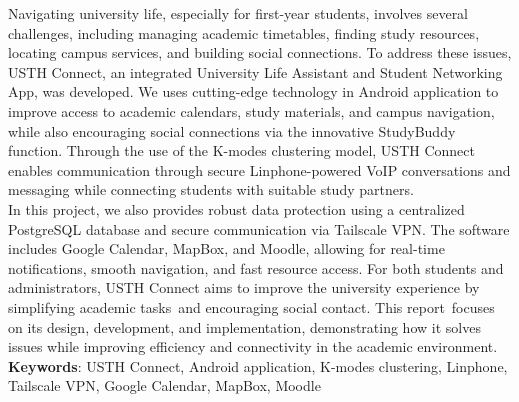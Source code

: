 \noindent Navigating university life, 
especially for first-year students, involves several 
challenges, including managing academic timetables, 
finding study resources, locating campus services, 
and building social connections. To address these 
issues, USTH Connect, an integrated University 
Life Assistant and Student Networking App, 
was developed. We uses cutting-edge 
technology in Android application to improve access to academic calendars, 
study materials, and campus navigation, 
while also encouraging social connections 
via the innovative StudyBuddy function. 
Through the use of the K-modes clustering model, 
USTH Connect enables communication through secure 
Linphone-powered VoIP conversations and messaging 
while connecting students with suitable study partners.\\

\noindent In this project, we also provides robust data protection
using a centralized PostgreSQL database and secure 
communication via Tailscale VPN. The software 
includes Google Calendar, MapBox, and Moodle, 
allowing for real-time notifications, 
smooth navigation, and fast resource access. 
For both students and administrators, 
USTH Connect aims to improve the university 
experience by simplifying academic tasks and 
encouraging social contact. This report focuses 
on its design, development, and implementation, 
demonstrating how it solves issues while improving 
efficiency and connectivity in the academic 
environment.\\

\noindent \textbf{Keywords}: USTH Connect, Android application,
K-modes clustering, Linphone, Tailscale VPN, Google Calendar, MapBox, Moodle

